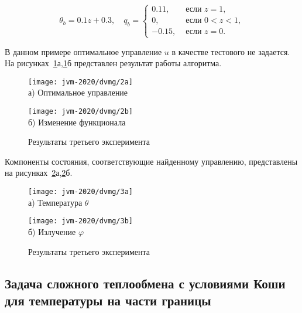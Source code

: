 \[
    \theta_{b}=0.1 z+0.3, \quad q_{b}=
    \begin{cases}
        0.11, & \text { если } z=1, \\
        0, & \text { если } 0<z<1, \\
        -0.15, & \text { если } z=0.
    \end{cases}
\]


В данном примере оптимальное управление $u$ в качестве тестового не задается.
На рисунках~\ref{fig:4_4:3}а,\ref{fig:4_4:3}б представлен результат работы алгоритма.

\begin{figure}[ht]
    \begin{minipage}[b][][b]{0.49\linewidth}
        \centering
        \texttt{[image: jvm-2020/dvmg/2a]}
        \\ а) Оптимальное управление
    \end{minipage}
    \hfill
    \begin{minipage}[b][][b]{0.49\linewidth}
        \centering
        \texttt{[image: jvm-2020/dvmg/2b]}
        \\ б) Изменение функционала  %
    \end{minipage}
    \caption{Результаты третьего эксперимента}
    \label{fig:4_4:3}
\end{figure}

Компоненты состояния, соответствующие найденному управлению, представлены на
рисунках~\ref{fig:4_4:4}а,\ref{fig:4_4:4}б.


\begin{figure}[ht]
    \begin{minipage}[b][][b]{0.49\linewidth}
        \centering
        \texttt{[image: jvm-2020/dvmg/3a]}
        \\ а) Температура $\theta$
    \end{minipage}
    \hfill
    \begin{minipage}[b][][b]{0.49\linewidth}
        \centering
        \texttt{[image: jvm-2020/dvmg/3b]}
        \\ б) Излучение $\varphi$
    \end{minipage}
    \caption{Результаты третьего эксперимента}
    \label{fig:4_4:4}
\end{figure}

\subsection{
    Задача сложного теплообмена с условиями
    Коши для температуры на части границы
}\label{subsec:ch4/sec4/subsec2}

